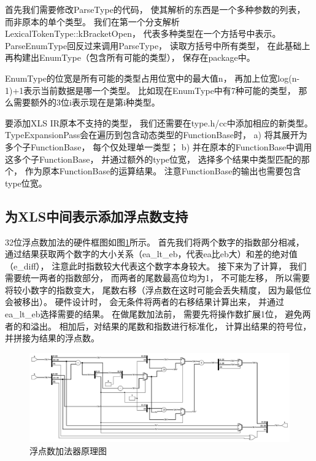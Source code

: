 首先我们需要修改ParseType的代码，
使其解析的东西是一个多种参数的列表，
而非原本的单个类型。
我们在第一个分支解析LexicalTokenType::kBracketOpen，
代表多种类型在一个方括号中表示。
ParseEnumType回反过来调用ParseType，
读取方括号中所有类型，
在此基础上再构建出EnumType（包含所有可能的类型），
保存在package中。

EnumType的位宽是所有可能的类型占用位宽中的最大值n，
再加上位宽log(n-1)+1表示当前数据是哪一个类型。
比如现在EnumType中有7种可能的类型，
那么需要额外的3位i表示现在是第i种类型。

要添加XLS IR原本不支持的类型，
我们还需要在type.h/cc中添加相应的新类型。
TypeExpansionPass会在遍历到包含动态类型的FunctionBase时，
a) 将其展开为多个子FunctionBase，
每个仅处理单一类型；
b) 并在原本的FunctionBase中调用这多个子FunctionBase，
并通过额外的type位宽，
选择多个结果中类型匹配的那个，
作为原本FunctionBase的运算结果。
注意FunctionBase的输出也需要包含type位宽。


\subsection{为XLS中间表示添加浮点数支持}

32位浮点数加法的硬件框图如图\ref{fig:float_add}所示。
首先我们将两个数字的指数部分相减，
通过结果获取两个数字的大小关系（ea\_lt\_eb，代表ea比eb大）和差的绝对值（e\_diff），
注意此时指数较大代表这个数字本身较大。
接下来为了计算，
我们需要统一两者的指数部分，
而两者的尾数最高位均为1，
不可能左移，
所以需要将较小数字的指数变大，
尾数右移（浮点数在这时可能会丢失精度，
因为最低位会被移出）。
硬件设计时，
会无条件将两者的右移结果计算出来，
并通过ea\_lt\_eb选择需要的结果。
在做尾数加法前，
需要先将操作数扩展1位，
避免两者的和溢出。
相加后，对结果的尾数和指数进行标准化，
计算出结果的符号位，
并拼接为结果的浮点数。

\begin{figure}[h]
\centering
\includegraphics[width=\linewidth]{figure/float_add.png}
\caption{浮点数加法器原理图}
\label{fig:float_add}
\end{figure}

